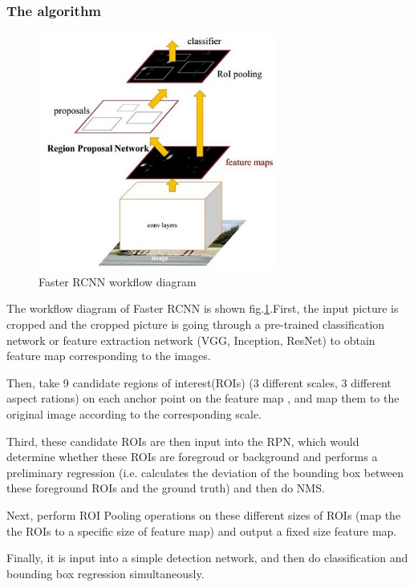 \subsubsection{The algorithm}
\begin{figure}[h!]
    \centering
    \includegraphics[width=0.7\textwidth]{Chapters/Fig/frrcnn.png}
    \caption{Faster \acrshort{RCNN} workflow diagram}
    \label{fig:frrcnn_workflow}
\end{figure}\par
The workflow diagram of Faster \acrshort{RCNN} is shown fig.\ref{fig:frrcnn_workflow}\cite{FrRCNN}.First, the input picture is cropped and the cropped picture is going through a pre-trained classification network or feature extraction network (VGG\cite{vgg}, Inception\cite{Szegedy_2015_CVPR}, ResNet\cite{He_2016_CVPR}) to obtain feature map corresponding to the images.\par
Then, take 9 candidate regions of interest(\acrshort{ROI}s) (3 different scales, 3 different aspect rations) on each anchor point on the feature map \cite{FrRCNN} , and map them to the original image according to the corresponding scale.\par
Third, these candidate \acrshort{ROI}s are then input into the \acrshort{RPN}, which would determine whether these \acrshort{ROI}s are foregroud or background and performs a preliminary regression (i.e. calculates the deviation of the bounding box between these foreground \acrshort{ROI}s and the ground truth) and then do \acrshort{NMS}\cite{SA}.\par
Next, perform ROI Pooling operations on these different sizes of \acrshort{ROI}s (map the the \acrshort{ROI}s to a specific size of feature map) and output a fixed size feature map.\par
Finally, it is input into a simple detection network, and then do classification and bounding box regression simultaneously.
